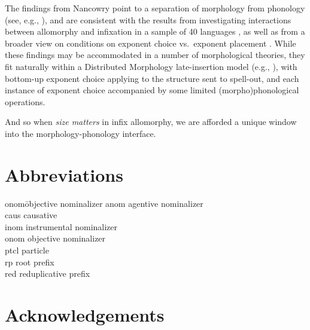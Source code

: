 \documentclass[output=paper]{langscibook}
\begin{document}
The findings from Nancowry point to a separation of morphology from phonology (see, e.g.,  \citealt{Trommer01,Paster06,Yu07,Embick10,BS12,Pak16,Dawson17,Kalin20,Rolle20,Stanton20}), and are consistent with the results from investigating interactions between allomorphy and infixation in a sample of 40 languages \citep{KalinIP}, as well as from a broader view on conditions on exponent choice vs.\ exponent placement \citep{KalinRolle21}. While these findings may be accommodated in a number of morphological theories, they fit naturally within a Distributed Morphology late-insertion model (e.g., \citealt{HalleMarantz93,HalleMarantz94,Embick10}), with bottom-up exponent choice applying to the structure sent to spell-out, and each instance of exponent choice accompanied by some limited (morpho)phonological operations.

And so when {\it size matters} in infix allomorphy, we are afforded a unique window into the morphology-phonology interface.



\section*{Abbreviations}
\begin{multicols}{2}
\begin{tabbing}
{\sc onom}\hspace{.5ex}\= objective nominalizer\kill
{\sc anom} \> agentive nominalizer \\
{\sc caus} \> causative \\
{\sc inom} \> instrumental nominalizer\\
{\sc onom} \> objective nominalizer\\
{\sc ptcl} \> particle\\
{\sc rp}   \> root prefix\\
{\sc red}  \> reduplicative prefix\\
\end{tabbing}
\end{multicols}

\section*{Acknowledgements}
\end{document}
